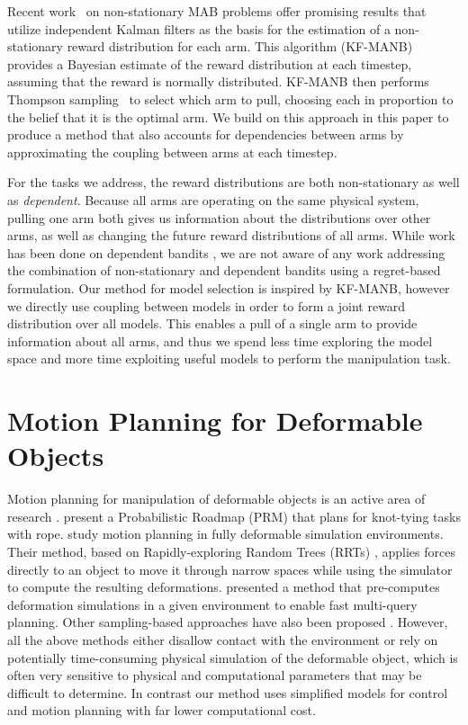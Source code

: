 Recent work~\cite{Granmo2010} on non-stationary MAB problems offer promising results that utilize independent Kalman filters as the basis for the estimation of a non-stationary reward distribution for each arm. This algorithm (KF-MANB) provides a Bayesian estimate of the reward distribution at each timestep, assuming that the reward is normally distributed. KF-MANB then performs Thompson sampling~\cite{Agrawal2012} to select which arm to pull, choosing each in proportion to the belief that it is the optimal arm. We build on this approach in this paper to produce a method that also accounts for dependencies between arms by approximating the coupling between arms at each timestep.

For the tasks we address, the reward distributions are both non-stationary as well as \textit{dependent}. Because all arms are operating on the same physical system, pulling one arm both gives us information about the distributions over other arms, as well as changing the future reward distributions of all arms. While work has been done on dependent bandits \cite{Pandey2007, Langford2008}, we are not aware of any work addressing the combination of non-stationary and dependent bandits using a regret-based formulation. Our method for model selection is inspired by KF-MANB, however we directly use coupling between models in order to form a joint reward distribution over all models. This enables a pull of a single arm to provide information about all arms, and thus we spend less time exploring the model space and more time exploiting useful models to perform the manipulation task.


\section{Motion Planning for Deformable Objects}

Motion planning for manipulation of deformable objects is an active area of research \cite{Jimenez2012}. \citet{Saha2008} present a Probabilistic Roadmap (PRM) \cite{Kavraki1996} that plans for knot-tying tasks with rope. \citet{Rodriguez2006} study motion planning in fully deformable simulation environments. Their method, based on Rapidly-exploring Random Trees (RRTs) \cite{LaValle2006}, applies forces directly to an object to move it through narrow spaces while using the simulator to compute the resulting deformations. \citet{Frank2011} presented a method that pre-computes deformation simulations in a given environment to enable fast multi-query planning. Other sampling-based approaches have also been proposed \cite{Anshelevich2000a, Lamiraux2001, BurchanBayazit2002, Gayle2005, Moll2006, Roussel2015}. However, all the above methods either disallow contact with the environment or rely on potentially time-consuming physical simulation of the deformable object, which is often very sensitive to physical and computational parameters that may be difficult to determine. In contrast our method uses simplified models for control and motion planning with far lower computational cost.

